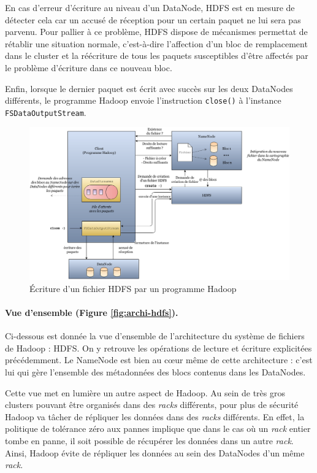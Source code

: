 \par En cas d'erreur d'écriture au niveau d'un DataNode, HDFS est en mesure de détecter cela car un accusé de réception pour un certain paquet ne lui sera pas parvenu. Pour pallier à ce problème, HDFS dispose de mécanismes permettat de rétablir une situation normale, c'est-à-dire l'affection d'un bloc de remplacement dans le cluster et la réécriture de tous les paquets susceptibles d'être affectés par le problème d'écriture dans ce nouveau bloc.

\par Enfin, lorsque le dernier paquet est écrit avec succès sur les deux DataNodes différents, le programme Hadoop envoie l'instruction \texttt{close()} à l'instance \texttt{FSDataOutputStream}.

\begin{figure}[h!]
  \centering
  \includegraphics[width=17cm]{images/writing_file.png}
  \caption{\'{E}criture d'un fichier HDFS par un programme Hadoop}
  \label{fig:ecriture-hdfs}
\end{figure}

\paragraph{Vue d'ensemble (Figure \ref{fig:archi-hdfs}).} Ci-dessous est donnée la vue d'ensemble de l'architecture du système de fichiers de Hadoop : HDFS. On y retrouve les opérations de lecture et écriture explicitées précédemment. Le NameNode est bien au c\oe{}ur même de cette architecture : c'est lui qui gère l'ensemble des métadonnées des blocs contenus dans les DataNodes.

\par Cette vue met en lumière un autre aspect de Hadoop. Au sein de très gros clusters pouvant être organisés dans des \textit{racks} différents, pour plus de sécurité Hadoop va tâcher de répliquer les données dans des \textit{racks} différents. En effet, la politique de tolérance zéro aux pannes implique que dans le cas où un \textit{rack} entier tombe en panne, il soit possible de récupérer les données dans un autre \textit{rack}. Ainsi, Hadoop évite de répliquer les données au sein des DataNodes d'un même \textit{rack}.

